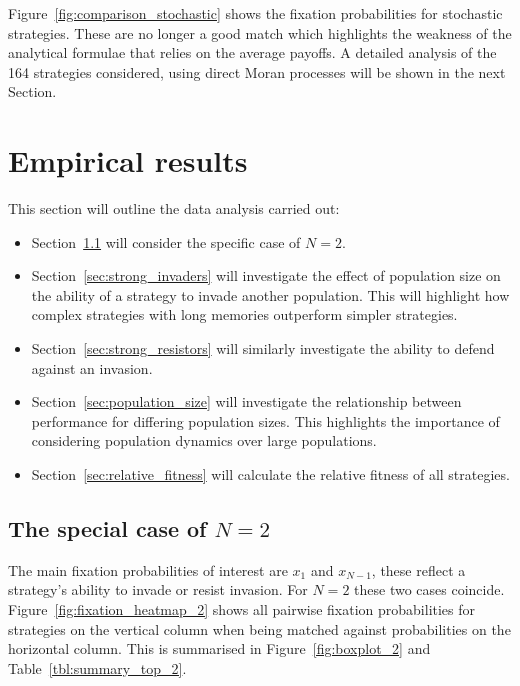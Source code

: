 \documentclass{article}
\begin{document}
Figure~\ref{fig:comparison_stochastic} shows the fixation probabilities for
stochastic strategies. These are no longer a good match which highlights the
weakness of the analytical formulae that relies on the average payoffs. A
detailed analysis of the 164 strategies considered, using direct Moran processes
will be shown in the next Section.

\section{Empirical results}\label{sec:empirical_results}


This section will outline the data analysis carried out:

\begin{itemize}
    \item Section~\ref{sec:two_individuals} will consider the specific case of
        \(N=2\).
    \item Section~\ref{sec:strong_invaders} will investigate the effect of
        population size on the ability of a strategy to invade another
        population. This will highlight how complex strategies with long
        memories outperform simpler strategies.
    \item Section~\ref{sec:strong_resistors} will similarly investigate the
        ability to defend against an invasion.
    \item Section~\ref{sec:population_size} will investigate the relationship
        between performance for differing population sizes. This highlights the
        importance of considering population dynamics over large populations.
    \item Section~\ref{sec:relative_fitness} will calculate the relative fitness of all
        strategies.
\end{itemize}

\subsection{The special case of \(N=2\)}\label{sec:two_individuals}

The main fixation probabilities of interest are \(x_1\) and \(x_{N-1}\), these
reflect a strategy's ability to invade or resist invasion.
For \(N=2\) these two cases coincide. Figure~\ref{fig:fixation_heatmap_2} shows
all pairwise fixation probabilities for strategies on the vertical column when
being matched against probabilities on the horizontal column. This is summarised
in Figure~\ref{fig:boxplot_2} and Table~\ref{tbl:summary_top_2}.
\end{document}
